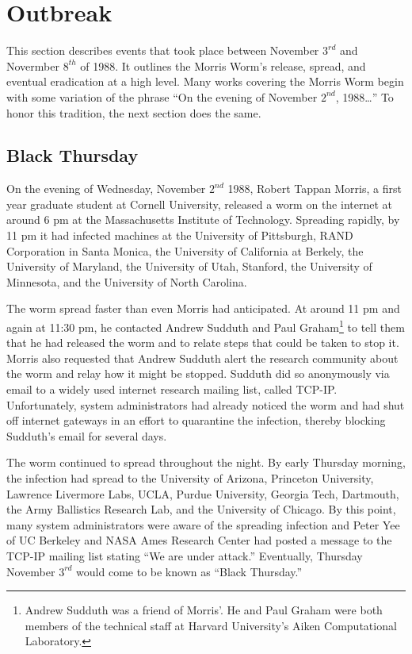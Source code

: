 \section*{Outbreak}
This section describes events that took place between November $3^{rd}$ and
Novermber $8^{th}$ of 1988. It outlines the Morris Worm's release, spread, and
eventual eradication at a high level.
Many works covering the Morris Worm begin with some variation of the phrase
``On the evening of November $2^{nd}$, 1988\ldots''
To honor this tradition, the next section does the same. 

\subsection*{Black Thursday}

On the evening of Wednesday, November $2^{nd}$ 1988, Robert Tappan Morris, a
first year graduate student at Cornell University, released a worm on the
internet at around 6 pm at the Massachusetts Institute of Technology.
Spreading rapidly, by 11 pm it had infected machines at
the University of Pittsburgh,
RAND Corporation in Santa Monica,
the University of California at Berkely,
the University of Maryland,
the University of Utah,
Stanford,
the University of Minnesota,
and the University of North
Carolina\cite{seeley_tour_1989}\cite{spafford_internet_1989-1}.

The worm spread faster than even Morris had anticipated. At around
11 pm and again at 11:30 pm, he contacted Andrew Sudduth and Paul
Graham\footnote{Andrew Sudduth was a friend of Morris'. He and Paul Graham
were both members of the technical staff at Harvard University's Aiken
Computational Laboratory\cite{lee_washpost_2013}.}
to tell them that he had released the worm and to relate steps that could be
taken to stop it. Morris also requested that Andrew Sudduth alert the research
community about the worm and relay how it might be stopped. 
Sudduth did so anonymously via email to a widely used internet research mailing
list, called TCP-IP.
Unfortunately, system administrators had already noticed the worm
and had shut off internet gateways in an effort to quarantine the infection, thereby blocking
Sudduth's email for several days\cite{lee_washpost_2013}\cite{eisenberg_cornell_1989}.

The worm continued to spread throughout the night. By early Thursday morning,
the infection had spread to the University of Arizona, Princeton University,
Lawrence Livermore Labs, UCLA, Purdue University, Georgia Tech, Dartmouth,
the Army Ballistics Research Lab, and the University of Chicago.
By this point, many system administrators were aware of the spreading
infection and Peter Yee of UC Berkeley and NASA Ames Research Center had
posted a message to the TCP-IP mailing list stating ``We are under
attack.''\cite{seeley_tour_1989}\cite{spafford_internet_1989-1} Eventually,
Thursday November $3^{rd}$ would come to be known as ``Black Thursday.'' 

